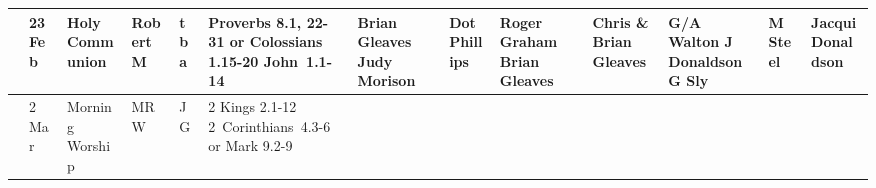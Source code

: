 \documentclass[10pt,a4paper]{article}
\begin{document}
\begin{landscape}
\begin{center}
{\begin{tabular}{|l|p{2cm}|p{1.4cm}|p{1.0cm}|p{0.8cm}|p{3.4cm}|p{2cm}|p{1.5cm}|p{2cm}|p{2cm}|p{1.9cm}
|p{2cm}|p{1.8cm}|}
& 23 Feb & Holy Communion & Robert M & tba &
Proverbs 8.1, 22-31 or 
Colossians 1.15-20 
\mbox{John 1.1-14}

& Brian Gleaves Judy Morison  & Dot Phillips & Roger Graham Brian
Gleaves & 
Chris \& Brian Gleaves  & 
G/A Walton  \linebreak J Donaldson  \linebreak G Sly
&  M Steel & Jacqui Donaldson \\
\hline %
& 2 Mar  & Morning Worship
 & MRW & JG & 
2 Kings 2.1-12 
\mbox{2 Corinthians 4.3-6} or
Mark 9.2-9 


\end{tabular}}
\end{center}
\end{landscape}
\end{document}
